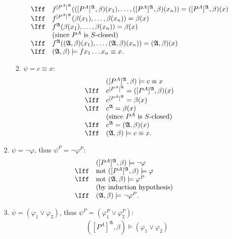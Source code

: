 \begin{enumerate}[1.]
\begin{enumerate}[1.]
\begin{enumerate}[(1)]
\[\begin{array}{ll}
\Iff & f^{[P^A]^{\mathfrak{A}}}(([P^A]^{\mathfrak{A}}, \beta)(x_1), \ldots, ([P^A]^{\mathfrak{A}}, \beta)(x_n)) = ([P^A]^{\mathfrak{A}}, \beta)(x) \\
\Iff & f^{[P^A]^{\mathfrak{A}}}(\beta(x_1), \ldots, \beta(x_n)) = \beta(x) \\
\Iff & f^{\mathfrak{A}}(\beta(x_1), \ldots, \beta(x_n)) = \beta(x) \\
\    & \mbox{(since $P^A$ is $S$-closed)} \\
\Iff & f^{\mathfrak{A}}((\mathfrak{A}, \beta)(x_1), \ldots, (\mathfrak{A}, \beta)(x_n)) = (\mathfrak{A}, \beta)(x) \\
\Iff & (\mathfrak{A}, \beta) \models fx_1 \ldots x_n \equiv x.
\end{array}
\]
\item $\psi = c \equiv x$:
\[
\begin{array}{ll}
\    & ([P^A]^{\mathfrak{A}}, \beta) \models c \equiv x \\
\Iff & c^{[P^A]^{\mathfrak{A}}} = ([P^A]^{\mathfrak{A}}, \beta)(x) \\
\Iff & c^{[P^A]^{\mathfrak{A}}} = \beta(x) \\
\Iff & c^{\mathfrak{A}} = \beta(x) \\
\    & \mbox{(since $P^A$ is $S$-closed)} \\
\Iff & c^{\mathfrak{A}} = (\mathfrak{A}, \beta)(x) \\
\Iff & (\mathfrak{A}, \beta) \models c \equiv x.
\end{array}
\]
\end{enumerate}
\item $\psi = \neg \varphi$, thus $\psi^P = \neg \varphi^P$:
\[
\begin{array}{ll}
\    & ([P^A]^{\mathfrak{A}}, \beta) \models \neg \varphi \\
\Iff & \mbox{not $([P^A]^{\mathfrak{A}}, \beta) \models \varphi$} \\
\Iff & \mbox{not $(\mathfrak{A}, \beta) \models \varphi^P$} \\
\    & \mbox{(by induction hypothesis)} \\
\Iff & (\mathfrak{A}, \beta) \models \neg \varphi^P.
\end{array}
\]
\item $\psi = (\varphi_1 \lor \varphi_2)$, thus $\psi^P = (\varphi_1^P \lor \varphi_2^P)$:
\[
\begin{array}{ll}
\    & ([P^A]^{\mathfrak{A}}, \beta) \models (\varphi_1 \lor \varphi_2) \\

\end{array}\]
\end{enumerate}
\end{enumerate}
